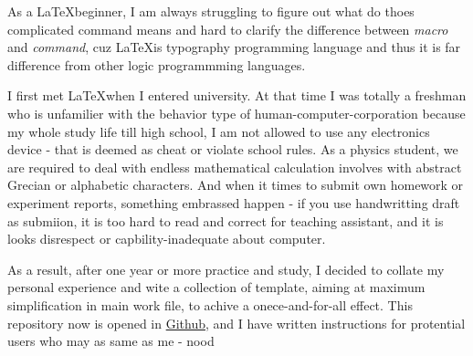     As a \LaTeX beginner, I am always struggling  to figure out what do thoes complicated command means and hard to clarify the difference between \emph{macro} and \emph{command}, cuz \LaTeX is typography programming language and thus it is far difference from other logic programmming languages. 

    I first met \LaTeX when I entered university. At that time I was totally a freshman who is unfamilier with the behavior type of human-computer-corporation because my whole study life till high school, I am not allowed to use any electronics device - that is deemed as cheat or violate school rules. As a physics student, we are required to deal with endless mathematical calculation involves with abstract Grecian or alphabetic characters. And when it times to submit own homework or experiment reports, something embrassed happen - if you use handwritting draft as submiion, it is too hard to read and correct for teaching assistant, and it is looks disrespect or capbility-inadequate about computer. 
    
    As a result, after one year or more practice and study, I decided to collate my personal experience and wite a collection of template, aiming at maximum simplification in main work file, to achive a onece-and-for-all effect. This repository now is opened in \href{https://github.com/SweetPastry/spTemplate}{Github}, and I have written instructions for protential users who may as same as me - nood
